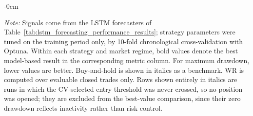 \begin{table}[H]
\begin{adjustwidth}{-\extralength}{0cm}
\begin{threeparttable}
\begin{tablenotes}[flushleft]
\footnotesize
\item \textit{Note:} Signals come from the LSTM forecasters of Table~\ref{tab:lstm_forecasting_performance_results}; strategy parameters were tuned on the training period only, by 10-fold chronological cross-validation with Optuna. Within each strategy and market regime, bold values denote the best model-based result in the corresponding metric column. For maximum drawdown, lower values are better. Buy-and-hold is shown in italics as a benchmark. WR is computed over evaluable closed trades only. Rows shown entirely in italics are runs in which the CV-selected entry threshold was never crossed, so no position was opened; they are excluded from the best-value comparison, since their zero drawdown reflects inactivity rather than risk control.
\end{tablenotes}
\end{threeparttable}
\end{adjustwidth}
\end{table}